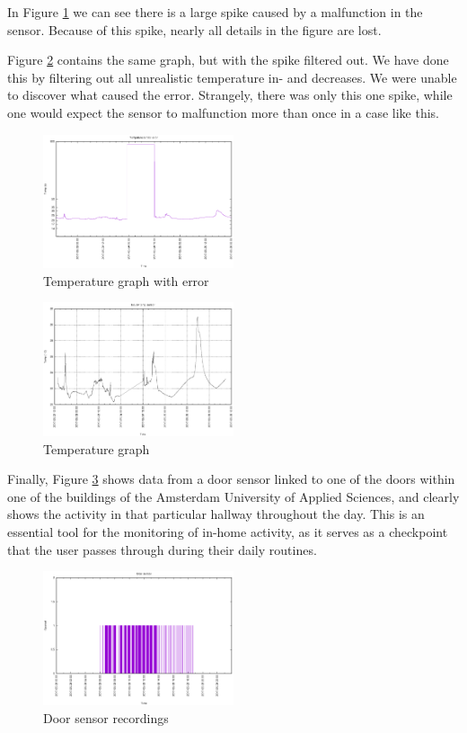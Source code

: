 \documentclass{below-ext}
\begin{document}
In  Figure \ref{fig:temperror} we can see there is a large spike caused by a malfunction in the sensor. Because of this spike, nearly all details in the figure are lost.

Figure  \ref{fig:temp} contains the same graph, but with the spike filtered out. We have done this by filtering out all unrealistic temperature in- and decreases. We were unable to discover what caused the error. Strangely, there was only this one spike, while one would expect the sensor to malfunction more than once in a case like this.

\begin{figure}
\centering
\includegraphics[width=0.5\textwidth]{temperror}
\caption{Temperature graph with error}
\label{fig:temperror}
\end{figure}

\begin{figure}
\centering
\includegraphics[width=0.5\textwidth]{graph}
\caption{Temperature graph}
\label{fig:temp}
\end{figure}

Finally, Figure \ref{fig:doorsensor} shows data from a door sensor linked to one of the doors within one of the buildings of the Amsterdam University of Applied Sciences, and clearly shows the activity in that particular hallway throughout the day. This is an essential tool for the monitoring of in-home activity, as it serves as a checkpoint that the user passes through during their daily routines.

\begin{figure}
\centering
\includegraphics[width=0.5\textwidth]{doorsensor}
\caption{Door sensor recordings}
\label{fig:doorsensor}
\end{figure}
\end{document}
